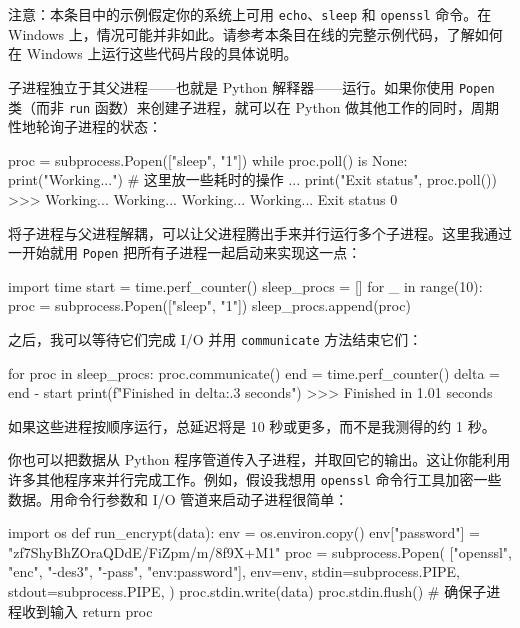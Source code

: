 注意：本条目中的示例假定你的系统上可用 \texttt{echo}、\texttt{sleep} 和 \texttt{openssl} 命令。在 Windows 上，情况可能并非如此。请参考本条目在线的完整示例代码，了解如何在 Windows 上运行这些代码片段的具体说明。

子进程独立于其父进程——也就是 Python 解释器——运行。如果你使用 \texttt{Popen} 类（而非 \texttt{run} 函数）来创建子进程，就可以在 Python 做其他工作的同时，周期性地轮询子进程的状态：

\begin{codebox}[python]
proc = subprocess.Popen(["sleep", "1"])
while proc.poll() is None:
    print("Working...")
    # 这里放一些耗时的操作
    ...
print("Exit status", proc.poll())
>>>
Working...
Working...
Working...
Working...
Exit status 0
\end{codebox}

将子进程与父进程解耦，可以让父进程腾出手来并行运行多个子进程。这里我通过一开始就用 \texttt{Popen} 把所有子进程一起启动来实现这一点：

\begin{codebox}[python]
import time
start = time.perf_counter()
sleep_procs = []
for _ in range(10):
    proc = subprocess.Popen(["sleep", "1"])
    sleep_procs.append(proc)
\end{codebox}

之后，我可以等待它们完成 I/O 并用 \texttt{communicate} 方法结束它们：

\begin{codebox}[python]
for proc in sleep_procs:
    proc.communicate()
end = time.perf_counter()
delta = end - start
print(f"Finished in {delta:.3} seconds")
>>>
Finished in 1.01 seconds
\end{codebox}

如果这些进程按顺序运行，总延迟将是 10 秒或更多，而不是我测得的约 1 秒。

你也可以把数据从 Python 程序管道传入子进程，并取回它的输出。这让你能利用许多其他程序来并行完成工作。例如，假设我想用 \texttt{openssl} 命令行工具加密一些数据。用命令行参数和 I/O 管道来启动子进程很简单：

\begin{codebox}[python]
import os
def run_encrypt(data):
    env = os.environ.copy()
    env["password"] = "zf7ShyBhZOraQDdE/FiZpm/m/8f9X+M1"
    proc = subprocess.Popen(
        ["openssl", "enc", "-des3", "-pass", "env:password"],
        env=env,
        stdin=subprocess.PIPE,
        stdout=subprocess.PIPE,
    )
    proc.stdin.write(data)
    proc.stdin.flush()  # 确保子进程收到输入
    return proc
\end{codebox}

